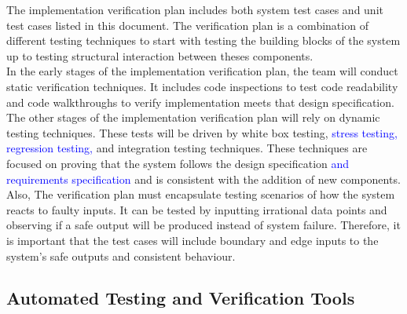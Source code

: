 \documentclass[12pt, titlepage]{article}
\begin{document}
The implementation verification plan includes both
system test cases and unit test cases listed in this 
document. The verification plan is a combination of 
different testing techniques to start with testing the 
building blocks of the system up to testing structural 
interaction between theses components.\\ 
In the early stages of the implementation verification 
plan, the team will conduct static verification
techniques. It includes code inspections to test code 
readability and code walkthroughs to verify 
implementation meets that design specification. \\
The other stages of the implementation verification plan will rely on dynamic 
testing techniques. These tests will be driven by white box testing, \textcolor{blue}{stress testing, regression testing,} and 
integration testing techniques. These techniques are focused on proving that 
the system follows the design specification \textcolor{blue}{and requirements specification} and is consistent with the addition of
new components. Also, The verification plan must encapsulate testing scenarios of how the system reacts to faulty inputs. It can be tested by inputting irrational data points and observing if a safe output will be produced instead of system failure. Therefore, it is important that the test cases will include boundary and edge inputs to the system's safe outputs and consistent behaviour. 



\subsection{Automated Testing and Verification Tools}

\end{document}
